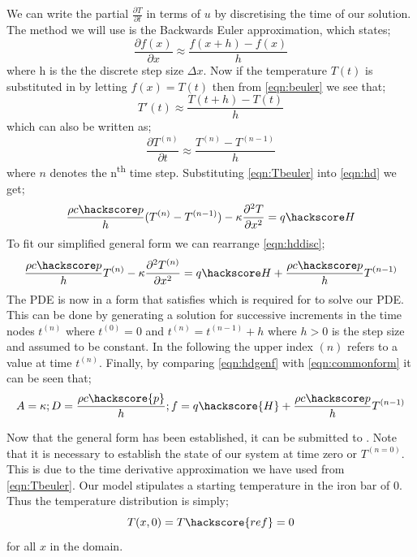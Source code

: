 We can write the partial $\frac{\partial T}{\partial t}$ in terms of $u$ by discretising the time of our solution. The method we will use is the Backwards Euler approximation, which states;
\begin{equation}
\frac{\partial f(x)}{\partial x} \approx \frac{f(x+h)-f(x)}{h}
\label{eqn:beuler}
\end{equation}
where h is the the discrete step size $\Delta x$.
Now if the temperature $T(t)$ is substituted in by letting $f(x) = T(t)$ then from \ref{eqn:beuler} we see that;
\begin{equation}
T'(t) \approx \frac{T(t+h) - T(t)}{h}
\end{equation}
which can also be written as;
\begin{equation}
\frac{\partial T^{(n)}}{\partial t} \approx \frac{T^{(n)} - T^{(n-1)}}{h}
\label{eqn:Tbeuler}
\end{equation}
where $n$ denotes the n\textsuperscript{th} time step. Substituting \ref{eqn:Tbeuler} into \ref{eqn:hd} we get;
\begin{equation}
\frac{\rho c\hackscore p}{h} (T^{(n)} - T^{(n-1)}) - \kappa \frac{\partial^{2} T}{\partial x^{2}} = q\hackscore H 
\label{eqn:hddisc}
\end{equation}
To fit our simplified general form we can rearrange \ref{eqn:hddisc};
\begin{equation}
\frac{\rho c\hackscore p}{h} T^{(n)} - \kappa \frac{\partial^2 T^{(n)}}{\partial x^2} = q\hackscore H +  \frac{\rho c\hackscore p}{h} T^{(n-1)}
\label{eqn:hdgenf}
\end{equation}
The PDE is now in a form that satisfies  which is required for \ESCRIPT to solve our PDE. This can be done by generating a solution for successive increments in the time nodes $t^{(n)}$ where 
$t^{(0)}=0$ and  $t^{(n)}=t^{(n-1)}+h$ where $h>0$ is the step size and assumed to be constant. 
In the following the upper index ${(n)}$ refers to a value at time $t^{(n)}$. Finally, by comparing \ref{eqn:hdgenf} with \ref{eqn:commonform} it can be seen that;
\begin{equation}
A = \kappa; D = \frac{\rho c \hackscore{p}}{h}; f = q \hackscore{H} + \frac{\rho c\hackscore p}{h} T^{(n-1)}
\end{equation}

Now that the general form has been established, it can be submitted to \ESCRIPT. Note that it is necessary to establish the state of our system at time zero or $T^{(n=0)}$. This is due to the time derivative approximation we have used from \ref{eqn:Tbeuler}. Our model stipulates a starting temperature in the iron bar of 0\textcelsius. Thus the temperature distribution is simply;
\begin{equation}
T(x,0) = T\hackscore{ref} = 0
\end{equation}
for all $x$ in the domain. 

